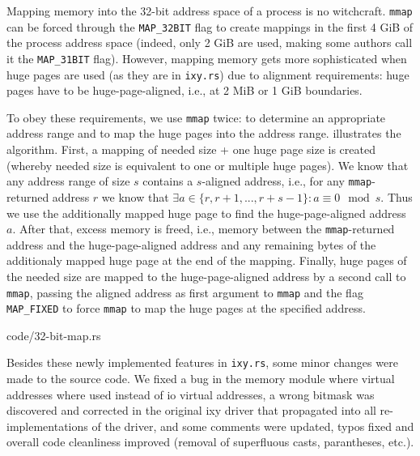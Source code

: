 Mapping memory into the 32-bit address space of a process is no witchcraft.
\texttt{mmap} can be forced through the \texttt{MAP\_32BIT} flag to create
mappings in the first 4 GiB of the process address space (indeed, only 2 GiB are
used, making some authors call it the \texttt{MAP\_31BIT} flag). However,
mapping memory gets more sophisticated when huge pages are used (as they are in
\texttt{ixy.rs}) due to alignment requirements: huge pages have to be
huge-page-aligned, i.e., at 2 MiB or 1 GiB boundaries.

To obey these requirements, we use \texttt{mmap} twice: to determine an
appropriate address range and to map the huge pages into the address range.
 illustrates the algorithm. First, a mapping of needed
size + one huge page size is created (whereby needed size is equivalent to one
or multiple huge pages). We know that any address range of size $s$ contains a
$s$-aligned address, i.e., for any \texttt{mmap}-returned address $r$ we know
that ${\exists a \in \{r, r + 1, ..., r + s - 1\}: a \equiv 0 \mod s}$. Thus we
use the additionally mapped huge page to find the huge-page-aligned address $a$.
After that, excess memory is freed, i.e., memory between the
\texttt{mmap}-returned address and the huge-page-aligned address and any
remaining bytes of the additionaly mapped huge page at the end of the mapping.
Finally, huge pages of the needed size are mapped to the huge-page-aligned
address by a second call to \texttt{mmap}, passing the aligned address as first
argument to \texttt{mmap} and the flag \texttt{MAP\_FIXED} to force
\texttt{mmap} to map the huge pages at the specified address.

\begin{minipage}{\textwidth}
    
        {code/32-bit-map.rs}
\end{minipage}

Besides these newly implemented features in \texttt{ixy.rs}, some minor changes
were made to the source code. We fixed a bug in the memory module where virtual
addresses where used instead of \ac{io} virtual addresses, a wrong bitmask was
discovered and corrected in the original ixy driver \cite{emmerich2019user} that
propagated into all re-implementations \cite{emmerich2019case} of the driver,
and some comments were updated, typos fixed and overall code cleanliness
improved (removal of superfluous casts, parantheses, etc.).


